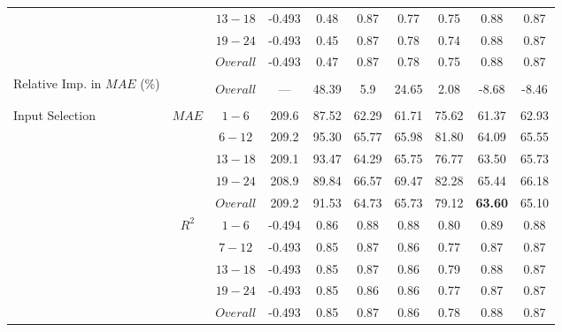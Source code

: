 \begin{table}[h]
\begin{center}
\begin{tabular}{@{}p{5.3em}ccccccccc@{}}
                                              &                   & $13 - 18$ & -0.493 & 0.48 & 0.87 & 0.77 & 0.75 & 0.88 & 0.87 \\
                                              &                   & $19 - 24$ & -0.493 & 0.45 & 0.87 & 0.78 & 0.74 & 0.88 & 0.87 \\
                                              &                   & $Overall$ & -0.493 & 0.47 & 0.87 & 0.78 & 0.75 & 0.88 & 0.87 \\ 
    \midrule
    \multirow{3}{5em}{Relative Imp. in $MAE$ (\%)} & & & & & & & & & \\
    & & $Overall$ & --- & 48.39 & 5.9 & 24.65 & 2.08 & -8.68 & -8.46 \\ 
    & & & & & & & & & \\ 
    \midrule
    \multirow{10}{5em}{Input Selection}
                                              & \multirow{5}{*}{$MAE$} & $1 - 6$ & 209.6 & 87.52 & 62.29 & 61.71 & 75.62 & 61.37 & 62.93 \\
                                              &                   & $6 - 12$ & 209.2 & 95.30 & 65.77 & 65.98 & 81.80 & 64.09 & 65.55 \\
                                              &                   & $13 - 18$ & 209.1 & 93.47 & 64.29 & 65.75 & 76.77 & 63.50 & 65.73 \\
                                              &                   & $19 - 24$ & 208.9 & 89.84 & 66.57 & 69.47 & 82.28 & 65.44 & 66.18 \\
                                              &                   & $Overall$ & 209.2 & 91.53 & 64.73 & 65.73 & 79.12 & \textbf{63.60} & 65.10 \\ \cmidrule(lr){2-10}
                                              & \multirow{5}{*}{$R^2$} & $1 - 6$ & -0.494 & 0.86 & 0.88 & 0.88 & 0.80 & 0.89 & 0.88 \\
                                              &                   & $7 - 12$ & -0.493 & 0.85 & 0.87 & 0.86 & 0.77 & 0.87 & 0.87 \\
                                              &                   & $13 - 18$ & -0.493 & 0.85 & 0.87 & 0.86 & 0.79 & 0.88 & 0.87 \\
                                              &                   & $19 - 24$ & -0.493 & 0.85 & 0.86 & 0.86 & 0.77 & 0.87 & 0.87 \\
                                              &                   & $Overall$ & -0.493 & 0.85 & 0.87 & 0.86 & 0.78 & 0.88 & 0.87 \\ 
    \bottomrule
    \end{tabular}
\end{center}
\end{table}

